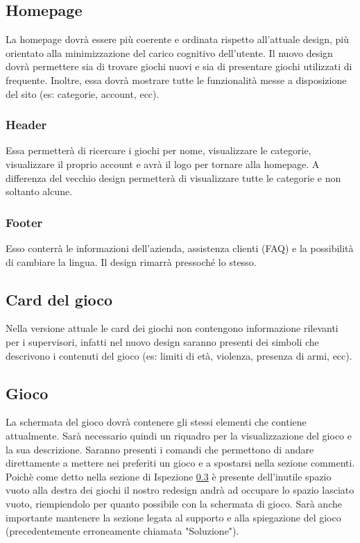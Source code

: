\documentclass[../Report.tex]{subfiles}
\begin{document}
    \subsection{Homepage}
    La homepage dovrà essere più coerente e ordinata rispetto all'attuale design, più orientato alla minimizzazione del carico cognitivo dell'utente. Il nuovo design dovrà permettere sia di trovare giochi nuovi e sia di presentare giochi utilizzati di frequente. Inoltre, essa dovrà mostrare tutte le funzionalità messe a disposizione del sito (es: categorie, account, ecc).

    \subsubsection{Header}
    Essa permetterà di ricercare i giochi per nome, visualizzare le categorie, visualizzare il proprio account e avrà il logo per tornare alla homepage. A differenza del vecchio design permetterà di visualizzare tutte le categorie e non soltanto alcune. 

    \subsubsection{Footer}
    Esso conterrà le informazioni dell'azienda, assistenza clienti (FAQ) e la possibilità di cambiare la lingua. Il design rimarrà pressoché lo stesso.
    
    \subsection{Card del gioco}
    Nella versione attuale le card dei giochi non contengono informazione rilevanti per i supervisori, infatti nel nuovo design saranno presenti dei simboli che descrivono i contenuti del gioco (es: limiti di età, violenza, presenza di armi, ecc).

    \subsection{Gioco}
    La schermata del gioco dovrà contenere gli stessi elementi che contiene attualmente. Sarà necessario quindi un riquadro per la visualizzazione del gioco e la sua descrizione. Saranno presenti i comandi che permettono di andare direttamente a mettere nei preferiti un gioco e a spostarsi nella sezione commenti. Poichè come detto nella sezione di Ispezione \ref{} è presente dell'inutile spazio vuoto alla destra dei giochi il nostro redesign andrà ad occupare lo spazio lasciato vuoto, riempiendolo per quanto possibile con la schermata di gioco. Sarà anche importante mantenere la sezione legata al supporto e alla spiegazione del gioco (precedentemente erroneamente chiamata "Soluzione").
\end{document}
